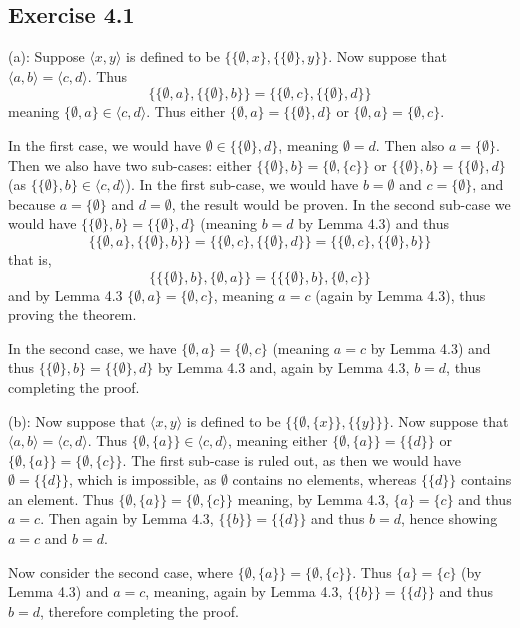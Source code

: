 \documentclass{article}
\theoremstyle{definition}
\begin{document}
\subsection*{Exercise 4.1}
(a): Suppose $\langle x,y\rangle$ is defined to be $\{\{\emptyset ,x\},\{\{\emptyset\},y\}\}$. Now suppose that 
$\langle a,b\rangle =\langle c,d\rangle$. Thus \[ \{\{\emptyset ,a\},\{\{\emptyset\},b\}\}=\{\{\emptyset ,c\},\{\{\emptyset\},d\}\} \]
meaning $\{\emptyset ,a\}\in \langle c,d\rangle$. Thus either $\{\emptyset ,a\}=\{\{\emptyset\},d\}$ or 
$\{\emptyset ,a\}=\{\emptyset ,c\}$. 


In the first case, we would have $\emptyset\in\{\{\emptyset\},d\}$, meaning $\emptyset=d$. Then also 
$a=\{\emptyset\}$. Then we also have two sub-cases: either $\{\{\emptyset\},b\}=\{\emptyset,\{c\}\}$ or 
$\{\{\emptyset\},b\}=\{\{\emptyset\},d\}$ (as $\{\{\emptyset\},b\}\in\langle c,d\rangle$). 
In the first sub-case, we would have $b=\emptyset$ and $c=\{\emptyset\}$, and because $a=\{\emptyset\}$ and 
$d=\emptyset$, the result would be proven. In the second sub-case we would have $\{\{\emptyset\},b\}=\{\{\emptyset\},d\}$ (meaning $b=d$ by Lemma 4.3) and thus 
\[ \{\{\emptyset ,a\},\{\{\emptyset\},b\}\}=\{\{\emptyset ,c\},\{\{\emptyset\},d\}\}=\{\{\emptyset ,c\},\{\{\emptyset\},b\}\} \]
that is,
\[ \{\{\{\emptyset\},b\},\{\emptyset ,a\}\}=\{\{\{\emptyset\},b\},\{\emptyset ,c\}\} \] and by Lemma 4.3 
$\{\emptyset ,a\}=\{\emptyset,c\}$, meaning $a=c$ (again by Lemma 4.3), thus proving the theorem.


In the second case, we have $\{\emptyset ,a\}=\{\emptyset ,c\}$ (meaning $a=c$ by Lemma 4.3) and thus $\{\{\emptyset\},b\}=\{\{\emptyset\},d\}$ by Lemma 4.3 
and, again by Lemma 4.3, $b=d$, thus completing the proof.


(b): Now suppose that $\langle x,y\rangle$ is defined to be $\{\{\emptyset,\{x\}\},\{\{y\}\}\}$. Now suppose that
$\langle a,b\rangle =\langle c,d\rangle$. Thus $\{\emptyset,\{a\}\}\in \langle c,d\rangle$, meaning either 
$\{\emptyset,\{a\}\}=\{\{d\}\}$ or $\{\emptyset,\{a\}\}=\{\emptyset,\{c\}\}$. The first sub-case is ruled out, as then we would have $\emptyset=\{\{d\}\}$, which is 
impossible, as $\emptyset$ contains no elements, whereas $\{\{d\}\}$ contains an element. Thus $\{\emptyset,\{a\}\}=\{\emptyset,\{c\}\}$ meaning, by Lemma 4.3, 
$\{a\}=\{c\}$ and thus $a=c$. Then again by Lemma 4.3, $\{\{b\}\}=\{\{d\}\}$ and thus $b=d$, hence showing $a=c$ and $b=d$.


Now consider the second case, where $\{\emptyset,\{a\}\}=\{\emptyset,\{c\}\}$. Thus $\{a\}=\{c\}$ (by Lemma 4.3) and $a=c$, meaning, again by Lemma 4.3, 
$\{\{b\}\}=\{\{d\}\}$ and thus $b=d$, therefore completing the proof.
\end{document}
